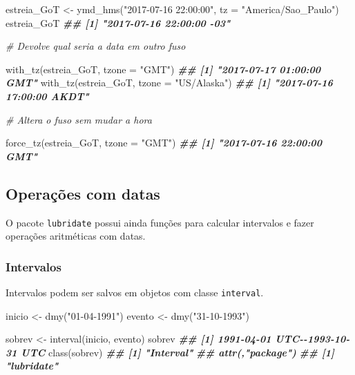 \documentclass[
]{book}
\newenvironment{Shaded}{\begin{snugshade}}{\end{snugshade}}
\newcommand{\AttributeTok}[1]{\textcolor[rgb]{0.77,0.63,0.00}{#1}}
\newcommand{\CommentTok}[1]{\textcolor[rgb]{0.56,0.35,0.01}{\textit{#1}}}
\newcommand{\DocumentationTok}[1]{\textcolor[rgb]{0.56,0.35,0.01}{\textbf{\textit{#1}}}}
\newcommand{\FunctionTok}[1]{\textcolor[rgb]{0.00,0.00,0.00}{#1}}
\newcommand{\NormalTok}[1]{#1}
\newcommand{\OtherTok}[1]{\textcolor[rgb]{0.56,0.35,0.01}{#1}}
\newcommand{\StringTok}[1]{\textcolor[rgb]{0.31,0.60,0.02}{#1}}
\begin{document}
\begin{Shaded}
\begin{Highlighting}[]
\NormalTok{estreia\_GoT }\OtherTok{\textless{}{-}} \FunctionTok{ymd\_hms}\NormalTok{(}\StringTok{"2017{-}07{-}16 22:00:00"}\NormalTok{, }\AttributeTok{tz =} \StringTok{"America/Sao\_Paulo"}\NormalTok{)}
\NormalTok{estreia\_GoT}
\DocumentationTok{\#\# [1] "2017{-}07{-}16 22:00:00 {-}03"}

\CommentTok{\# Devolve qual seria a data em outro fuso}

\FunctionTok{with\_tz}\NormalTok{(estreia\_GoT, }\AttributeTok{tzone =} \StringTok{"GMT"}\NormalTok{)}
\DocumentationTok{\#\# [1] "2017{-}07{-}17 01:00:00 GMT"}
\FunctionTok{with\_tz}\NormalTok{(estreia\_GoT, }\AttributeTok{tzone =} \StringTok{"US/Alaska"}\NormalTok{)  }
\DocumentationTok{\#\# [1] "2017{-}07{-}16 17:00:00 AKDT"}

\CommentTok{\# Altera o fuso sem mudar a hora}

\FunctionTok{force\_tz}\NormalTok{(estreia\_GoT, }\AttributeTok{tzone =} \StringTok{"GMT"}\NormalTok{)}
\DocumentationTok{\#\# [1] "2017{-}07{-}16 22:00:00 GMT"}
\end{Highlighting}
\end{Shaded}

\hypertarget{operauxe7uxf5es-com-datas}{%
\subsection{Operações com datas}\label{operauxe7uxf5es-com-datas}}

O pacote \texttt{lubridate} possui ainda funções para calcular intervalos e fazer operações aritméticas com datas.

\hypertarget{intervalos}{%
\subsubsection*{Intervalos}\label{intervalos}}

Intervalos podem ser salvos em objetos com classe \texttt{interval}.

\begin{Shaded}
\begin{Highlighting}[]
\NormalTok{inicio }\OtherTok{\textless{}{-}} \FunctionTok{dmy}\NormalTok{(}\StringTok{"01{-}04{-}1991"}\NormalTok{)}
\NormalTok{evento }\OtherTok{\textless{}{-}} \FunctionTok{dmy}\NormalTok{(}\StringTok{"31{-}10{-}1993"}\NormalTok{)}

\NormalTok{sobrev }\OtherTok{\textless{}{-}} \FunctionTok{interval}\NormalTok{(inicio, evento)}
\NormalTok{sobrev}
\DocumentationTok{\#\# [1] 1991{-}04{-}01 UTC{-}{-}1993{-}10{-}31 UTC}
\FunctionTok{class}\NormalTok{(sobrev)}
\DocumentationTok{\#\# [1] "Interval"}
\DocumentationTok{\#\# attr(,"package")}
\DocumentationTok{\#\# [1] "lubridate"}
\end{Highlighting}
\end{Shaded}
\end{document}
